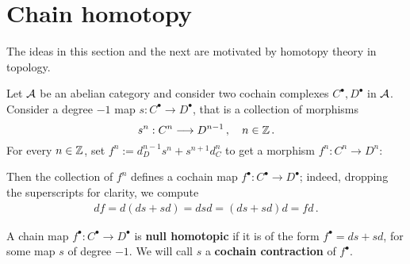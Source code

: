 
\section{Chain homotopy}

The ideas in this section and the next are motivated 
by homotopy theory in topology. 

Let $\mathcal{A}$ be an abelian category and consider 
two cochain complexes $C^{\bullet}, D^{\bullet}$ in $\mathcal{A}$. 
Consider a degree $-1$ map $s : C^{\bullet} \to D^{\bullet}$,
that is a collection of morphisms
\begin{equation*}
    s^{n} : C^{n} \longrightarrow D^{n-1}\,,
    \quad n \in {\mathbb Z}\,.
\end{equation*}
For every $n \in {\mathbb Z}$, set $f^{n} := d_{D}^{n-1}s^{n} + s^{n+1}d_{C}^{n}$
to get a morphism $f^{n}:C^{n} \to D^{n}$:
\begin{center}
\end{center}

Then the collection of $f^{n}$ defines
a cochain map $f^{\bullet} : C^{\bullet} \to D^{\bullet}$;
indeed, dropping the superscripts for clarity, we compute
\begin{align*}
    d f = d(ds + sd) = dsd = (ds + sd) d = fd\,.
\end{align*}

\begin{df}
    A chain map $f^{\bullet}:C^{\bullet} \to D^{\bullet}$
    is \textbf{null homotopic} if it is of the form
    $f^{\bullet} = ds + sd$, for some map $s$ of degree $-1$.
    We will call $s$ a \textbf{cochain contraction} of $f^{\bullet}$.
\end{df}

